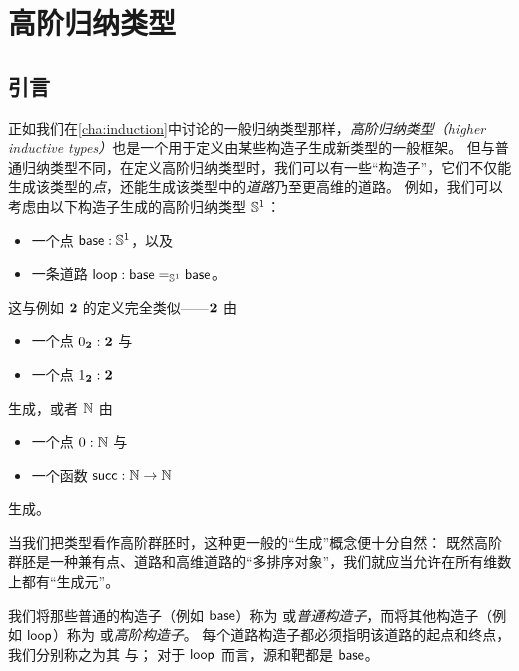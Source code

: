 \chapter{高阶归纳类型}
\label{cha:hits}

%
%
%

\section{引言}
\label{sec:intro-hits}


正如我们在\cref{cha:induction}中讨论的一般归纳类型那样，\emph{高阶归纳类型（higher inductive types）}也是一个用于定义由某些构造子生成新类型的一般框架。
但与普通归纳类型不同，在定义高阶归纳类型时，我们可以有一些``构造子''，它们不仅能生成该类型的\emph{点}，还能生成该类型中的\emph{道路}乃至更高维的道路。
%
%
例如，我们可以考虑由以下构造子生成的高阶归纳类型 $\Sn^1$：

\begin{itemize}
\item 一个点 $\base:\Sn^1$，以及
\item 一条道路 $\lloop : {\id[\Sn^1]\base\base}$。
\end{itemize}

这与例如 $\bool$ 的定义完全类似——$\bool$ 由
\begin{itemize}
\item 一个点 $\bfalse:\bool$ 与
\item 一个点 $\btrue:\bool$
\end{itemize}
生成，或者 $\nat$ 由
\begin{itemize}
\item 一个点 $0:\nat$ 与
\item 一个函数 $\suc:\nat\to\nat$
\end{itemize}
生成。

当我们把类型看作高阶群胚时，这种更一般的``生成''概念便十分自然：
既然高阶群胚是一种兼有点、道路和高维道路的``多排序对象''，我们就应当允许在所有维数上都有``生成元''。

我们将那些普通的构造子（例如 $\base$）称为
%
%
或\emph{普通构造子}，而将其他构造子（例如 $\lloop$）称为
%
%
或\emph{高阶构造子}。
每个道路构造子都必须指明该道路的起点和终点，我们分别称之为其
%
与；
%
对于 $\lloop$ 而言，源和靶都是 $\base$。

